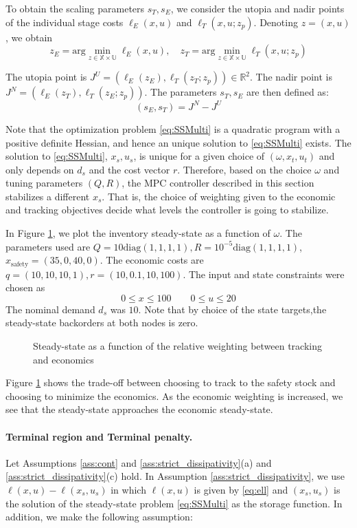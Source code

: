 \documentclass[10pt]{article}
\newcommand{\diag}{\text{diag}}
\theoremstyle{definition}
\begin{document}
To obtain the scaling parameters $s_T,s_E$, we consider the utopia and
nadir points of the individual stage costs $\ell_E(x,u)$ and
$\ell_T(x,u;z_p)$. Denoting $z = (x,u)$, we obtain
\[ z_E = \text{arg}\min_{z \in \mathbb{X} \times
  \mathbb{U}}{\ell_E(x,u)}, \quad z_T = \text{arg}\min_{z \in \mathbb{X} \times
  \mathbb{U}}{\ell_T(x,u;z_p)} \]

The utopia point is $J^U = (\ell_E(z_E),\ell_T(z_T;z_p))\in \mathbb{R}^2$. The
nadir point is $J^N = (\ell_E(z_T),\ell_T(z_E;z_p))$. The parameters
$s_T,s_E$ are then defined as:
\[ (s_E,s_T) = J^N-J^U \]

Note that  the optimization problem \eqref{eq:SSMulti} is a quadratic program with a positive
definite Hessian, and hence an unique solution to \eqref{eq:SSMulti}
exists.
The solution to \eqref{eq:SSMulti}, $x_s,u_s$,  is unique for a given
choice of $(\omega,x_t,u_t)$ and only depends on $d_s$ and
the cost vector $r$. Therefore, based on the choice $\omega$ and
tuning parameters $(Q,R)$, the MPC controller described in this section stabilizes a different
$x_s$. That is, the choice of weighting given to the economic and
tracking objectives decide what levels the controller is going to stabilize.


In Figure \ref{fig:SS_omega}, we plot the inventory steady-state as a
function of $\omega$. The parameters used are $ Q =
10\diag{(1,1,1,1)}, R = 10^{-5}\diag{(1,1,1,1)}$, $x_{\text{safety}}
= (35,0,40,0)$. The economic costs are $q = (10,10,10,1), r =
(10,0.1,10,100)$. The input and state constraints were chosen as
\[ 0 \leq x \leq 100 \qquad 0 \leq u \leq 20 \]
The nominal demand
$d_s$ was $10$. Note that by choice of the state targets,the
steady-state backorders at both nodes is zero.

\begin{figure}
\centering
\scriptsize
\resizebox{\textwidth}{!}{}
\caption{Steady-state as a function of the relative weighting between tracking and
  economics}
\label{fig:SS_omega}
\end{figure}

Figure \ref{fig:SS_omega} shows the trade-off between choosing to
track to the safety stock and choosing to minimize the economics. As
the economic weighting is increased, we see that the steady-state
approaches the economic steady-state.

\paragraph{Terminal region and Terminal penalty.}
Let  Assumptions \ref{ass:cont} and
\ref{ass:strict_dissipativity}(a) and
\ref{ass:strict_dissipativity}(c) hold. In Assumption
\ref{ass:strict_dissipativity}, we use $\ell(x,u)-\ell(x_s,u_s)$ in
which $\ell(x,u)$ is given by \eqref{eq:ell} and $(x_s,u_s)$ is the
solution of the steady-state problem \eqref{eq:SSMulti} as the storage
function. In addition, we make the following assumption:
\end{document}

